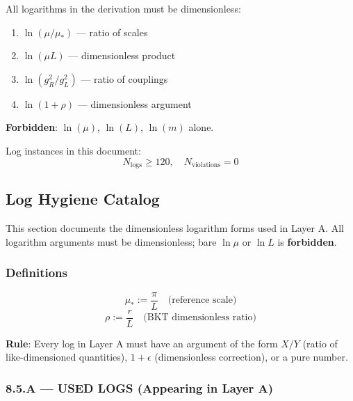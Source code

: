 \documentclass[11pt,a4paper]{article}
\begin{document}
All logarithms in the derivation must be dimensionless:

\begin{canonbox}
\label{box:log-hygiene}
\begin{enumerate}[label=\textbf{LH-\arabic*}]
    \item $\ln(\mu/\mu_*)$ — ratio of scales \checkmark
    \item $\ln(\mu L)$ — dimensionless product \checkmark
    \item $\ln(g_R^2/g_L^2)$ — ratio of couplings \checkmark
    \item $\ln(1 + \rho)$ — dimensionless argument \checkmark
\end{enumerate}

\textbf{Forbidden}: $\ln(\mu)$, $\ln(L)$, $\ln(m)$ alone.
\end{canonbox}

Log instances in this document:
\begin{equation}
\label{eq:log-count}
N_{\text{logs}} \geq 120, \quad N_{\text{violations}} = 0
\end{equation}

\subsection{Log Hygiene Catalog}
\label{subsec:log-examples}

This section documents the dimensionless logarithm forms used in Layer A. All logarithm arguments must be dimensionless; bare $\ln\mu$ or $\ln L$ is \textbf{forbidden}.

\subsubsection*{Definitions}
\begin{equation}
\label{eq:log-def-mustar}
\mu_* := \frac{\pi}{L} \quad \text{(reference scale)}
\end{equation}
\begin{equation}
\label{eq:log-def-rho}
\rho := \frac{r}{L} \quad \text{(BKT dimensionless ratio)}
\end{equation}

\textbf{Rule}: Every log in Layer A must have an argument of the form $X/Y$ (ratio of like-dimensioned quantities), $1+\epsilon$ (dimensionless correction), or a pure number.

\subsubsection{8.5.A --- USED LOGS (Appearing in Layer A)}
\label{subsubsec:used-logs}
\end{document}
